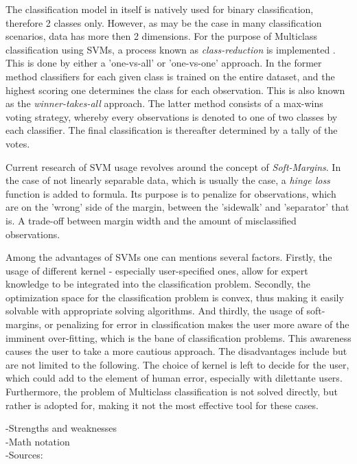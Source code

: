 		The classification model in itself is natively used for binary classification, therefore 2 classes only. However, as may be the case in many classification scenarios, data has more then 2 dimensions. For the purpose of Multiclass classification using SVMs, a process known as \textit{class-reduction} is implemented \cite{aly2005survey}. This is done by either a 'one-vs-all' or 'one-vs-one' approach. In the former method classifiers for each given class is trained on the entire dataset, and the highest scoring one determines the class for each observation. This is also known as the \textit{winner-takes-all} approach. The latter method consists of a max-wins voting strategy, whereby every observations is denoted to one of two classes by each classifier. The final classification is thereafter determined by a tally of the votes.
		
		Current research of SVM usage revolves around the concept of \textit{Soft-Margins}. In the case of not linearly separable data, which is usually the case, a \textit{hinge loss} function is added to formula. Its purpose is to penalize for observations, which are on the 'wrong' side of the margin, between the 'sidewalk' and 'separator' that is. A trade-off between margin width and the amount of misclassified observations.
		
		Among the advantages of SVMs one can mentions several factors. Firstly, the usage of different kernel - especially user-specified ones, allow for expert knowledge to be integrated into the classification problem. Secondly, the optimization space for the classification problem is convex, thus making it easily solvable with appropriate solving algorithms. And thirdly, the usage of soft-margins, or penalizing for error in classification makes the user more aware of the imminent over-fitting, which is the bane of classification problems. This awareness causes the user to take a more cautious approach. The disadvantages include but are not limited to the following. The choice of kernel is left to decide for the user, which could add to the element of human error, especially with dilettante users. Furthermore, the problem of Multiclass classification is not solved directly, but rather is adopted for, making it not the most effective tool for these cases.
		
		-Strengths and weaknesses\\
		-Math notation\\
		-Sources: \cite{SVM_burges1998tutorial} \cite{SVM_cortes1995support}
	
